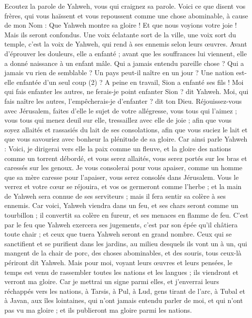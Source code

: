\begin{multicols}{2}
Ecoutez la parole de Yahweh, vous qui craignez sa parole. Voici ce que disent vos frères, qui vous haïssent et vous repoussent comme une chose abominable, à cause de mon Nom : Que Yahweh montre sa gloire ! Et que nous voyions votre joie ! Mais ils seront confondus.
Une voix éclatante sort de la ville, une voix sort du temple, c’est la voix de Yahweh, qui rend à ses ennemis selon leurs œuvres.
Avant d’éprouver les douleurs, elle a enfanté ; avant que les souffrances lui viennent, elle a donné naissance à un enfant mâle.
Qui a jamais entendu pareille chose ? Qui a jamais vu rien de semblable ? Un pays peut-il naître en un jour ? Une nation est-elle enfantée d’un seul coup (2) ? A peine en travail, Sion a enfanté ses fils !
Moi qui fais enfanter les autres, ne ferais-je point enfanter Sion ? dit Yahweh. Moi, qui fais naître les autres, l'empêcherais-je d'enfanter ? dit ton Dieu.
Réjouissez-vous avec Jérusalem, faites d’elle le sujet de votre allégresse, vous tous qui l’aimez ; vous tous qui menez deuil sur elle, tressaillez avec elle de joie ;
afin que vous soyez allaités et rassasiés du lait de ses consolations, afin que vous suciez le lait et que vous savouriez avec bonheur la plénitude de sa gloire.
Car ainsi parle Yahweh : Voici, je dirigerai vers elle la paix comme un fleuve, et la gloire des nations comme un torrent débordé, et vous serez allaités, vous serez portés sur les bras et caressés sur les genoux.
Je vous consolerai pour vous apaiser, comme un homme que sa mère caresse pour l'apaiser, vous serez consolés dans Jérusalem.
Vous le verrez et votre cœur se réjouira, et vos os germeront comme l'herbe ; et la main de Yahweh sera connue de ses serviteurs ; mais il fera sentir sa colère à ses ennemis.
Car voici, Yahweh viendra dans un feu, et ses chars seront comme un tourbillon ; il convertit sa colère en fureur, et ses menaces en flamme de feu.
C’est par le feu que Yahweh exercera ses jugements, c’est par son épée qu’il châtiera toute chair ; et ceux que tuera Yahweh seront en grand nombre.
Ceux qui se sanctifient et se purifient dans les jardins, au milieu desquels ils vont un à un, qui mangent de la chair de porc, des choses abominables, et des souris, tous ceux-là périront dit Yahweh.
Mais pour moi, voyant leurs œuvres et leurs pensées, le temps est venu de rassembler toutes les nations et les langues ; ils viendront et verront ma gloire.
Car je mettrai un signe parmi elles, et j'enverrai leurs réchappés vers les nations, à Tarsis, à Pul, à Lud, gens tirant de l'arc, à Tubal et à Javan, aux îles lointaines, qui n'ont jamais entendu parler de moi, et qui n'ont pas vu ma gloire ; et ils publieront ma gloire parmi les nations.

\end{multicols}
